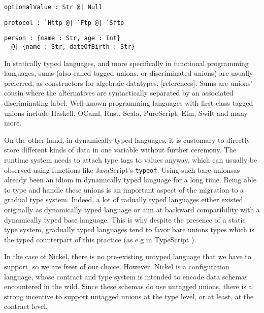 \documentclass[sigplan,10pt,review,anonymous]{acmart}
\newcommand{\resolved}[2]{}
\begin{document}
\label{fig:union-nullable-ex}
\begin{lstlisting}[title={Nullable values}]
optionalValue : Str @| Null
\end{lstlisting}

\label{fig:union-enum-ex}
\begin{lstlisting}[title={Plain enumeration}]
protocol : `Http @| `Ftp @| `Sftp
\end{lstlisting}

\label{fig:union-alt-ex}
\begin{lstlisting}[title={Alternative representations}]
person : {name : Str, age : Int}
  @| {name : Str, dateOfBirth : Str}
\end{lstlisting}

In statically typed languages, and more specifically in functional programming
languages, sums (also called tagged unions, or discriminated unions) are usually
preferred, as constructors for algebraic datatypes. [references]. Sums are unions' cousin where the alternatives are
syntactically separated by an associated discriminating label. Well-known
programming languages with first-class tagged unions include Haskell, OCaml,
Rust, Scala, PureScript, Elm, Swift and many more.

On the other hand, in dynamically typed languages, it is customary to directly
store different kinds of data in one variable without further ceremony. The
runtime system needs to attach type tags to values anyway, which can usually be
observed using functions like JavaScript's \verb+typeof+. Using such bare
unions\resolved{If you can observe with typeof, then it's pretty much a tagged
union, though the tag is implicit} has already been an idiom in dynamically
typed language for a long time. Being able to type and handle these unions is an
important aspect of the migration to a gradual type system. Indeed, a lot of
\resolved{This is the first time discussing gradual type systems, maybe it should
be introduced earlier, in particular how they relate to contracts
(I think is mentioned on the appendix)}
gradually typed languages either existed originally as dynamically typed
language or aim at backward compatibility with a dynamically typed base
language. This is why despite the presence of a static type system, gradually
typed languages tend to favor bare unions types which is the typed counterpart
of this practice (as e.g in TypeScript \cite{TypeScriptUnions}).

In the case of Nickel, there is no pre-existing untyped language that we have to
support, so we are freer of our choice. However, Nickel is a configuration
language, whose contract and type system is intended to encode data schemas encountered in the wild. Since these schemas do use
untagged unions, there is a strong incentive to support untagged unions at the
type level, or at least, at the contract level.
\end{document}
